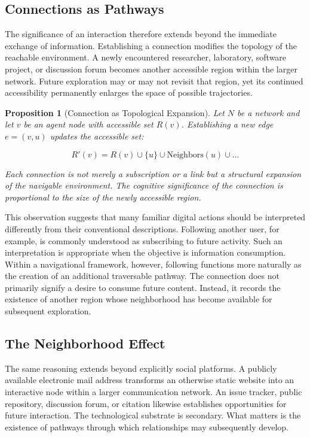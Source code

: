 \documentclass[12pt,oneside]{article}
\newtheorem{proposition}[definition]{Proposition}
\theoremstyle{remark}
\begin{document}
\subsection{Connections as Pathways}

The significance of an interaction therefore extends beyond the immediate exchange of information. Establishing a connection modifies the topology of the reachable environment. A newly encountered researcher, laboratory, software project, or discussion forum becomes another accessible region within the larger network. Future exploration may or may not revisit that region, yet its continued accessibility permanently enlarges the space of possible trajectories.

\begin{proposition}[Connection as Topological Expansion]
Let $N$ be a network and let $v$ be an agent node with accessible set $R(v)$. Establishing a new edge $e = (v, u)$ updates the accessible set:

\begin{equation}
R'(v) = R(v) \cup \{u\} \cup \text{Neighbors}(u) \cup \ldots
\end{equation}

Each connection is not merely a subscription or a link but a structural expansion of the navigable environment. The cognitive significance of the connection is proportional to the size of the newly accessible region.
\end{proposition}

This observation suggests that many familiar digital actions should be interpreted differently from their conventional descriptions. Following another user, for example, is commonly understood as subscribing to future activity. Such an interpretation is appropriate when the objective is information consumption. Within a navigational framework, however, following functions more naturally as the creation of an additional traversable pathway. The connection does not primarily signify a desire to consume future content. Instead, it records the existence of another region whose neighborhood has become available for subsequent exploration.

\subsection{The Neighborhood Effect}

The same reasoning extends beyond explicitly social platforms. A publicly available electronic mail address transforms an otherwise static website into an interactive node within a larger communication network. An issue tracker, public repository, discussion forum, or citation likewise establishes opportunities for future interaction. The technological substrate is secondary. What matters is the existence of pathways through which relationships may subsequently develop.
\end{document}
